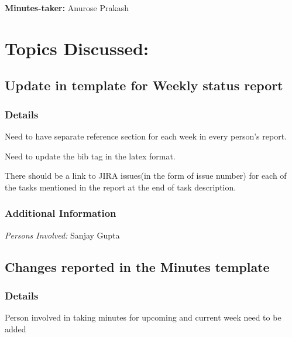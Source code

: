 \documentclass{meetingmins}
\begin{document}
\maketitle

\textbf{Minutes-taker:} Anurose Prakash

\section{Topics Discussed:}

\subsection{Update in template for Weekly status report}
        \subsubsection{Details}
        \begin{hiddensubitems}
            \item
                Need to have separate reference section for each week in every person's report.
            \item
                Need to update the bib tag in the latex format.
            \item
                There should be a link to JIRA issues(in the form of issue number) for each of the tasks mentioned in the report at the end of task description.
        \end{hiddensubitems}
        \subsubsection{Additional Information}
        \begin{hiddensubitems}
            \item
                \textit{Persons Involved: } Sanjay Gupta
        \end{hiddensubitems}

\subsection{Changes reported in the Minutes template}
        \subsubsection{Details}
        \begin{hiddensubitems}
            \item
                Person involved in taking minutes for upcoming and current week need to be added
                
        \end{hiddensubitems}
\end{document}
